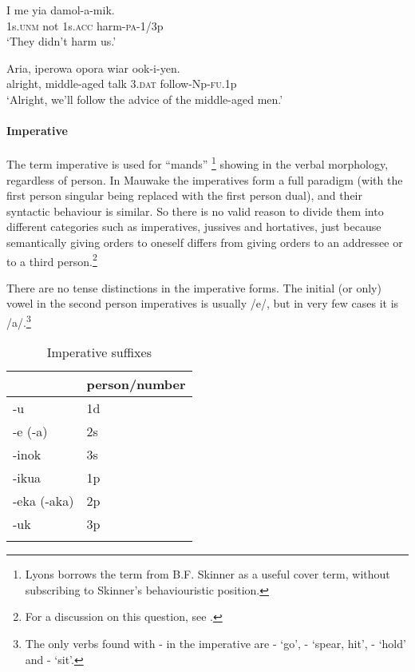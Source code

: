 \ea%
\label{ex:3:x693}
\gll I me yia damol-a-mik. \\
1s.\textsc{unm} not 1s.\textsc{acc} harm-\textsc{pa}-1/3p\\
\glt`They didn't harm us.'
\z

\ea%
\label{ex:3:x694}
\gll Aria, iperowa opora wiar ook-i-yen. \\
alright, middle-aged talk 3.\textsc{dat} follow-Np-\textsc{fu}.1p\\
\glt`Alright, we'll follow the advice of the middle-aged men.'
\z

\paragraph{Imperative}\label{sec:3:a:z:y:x}
{}
The term imperative is used for ``mands'' \citep[745]{Lyons1977}\footnote{Lyons borrows the term from B.F. Skinner as a useful cover term, without subscribing to Skinner's behaviouristic position.} showing in the verbal morphology, regardless of person. In Mauwake the imperatives form a full paradigm (with the first person singular being replaced with the first person dual), and their syntactic behaviour is similar. So there is no valid reason to divide them into different categories such as imperatives, jussives and hortatives, just because semantically giving orders to oneself differs from giving orders to an addressee or to a third person.\footnote{For a discussion on this question, see \citet[109--111]{Palmer1986}.}

There are no tense distinctions in the imperative forms. The initial (or only) vowel in the second person imperatives is usually /e/, but in very few cases it is /a/.\footnote{The only verbs found with - in the imperative are - `go', - `spear, hit', - `hold' and - `sit'.}

\begin{table}
\begin{tabular}{ll}
\mytoprule
&person/number \\
\midrule 
-u & 1d\\
-e (-a) & 2s\\
-inok & 3s\\
-ikua & 1p\\
-eka (-aka) & 2p\\
-uk & 3p\\
\mybottomrule 
\end{tabular}
\caption{Imperative suffixes}
\label{tab:12}
\end{table}

